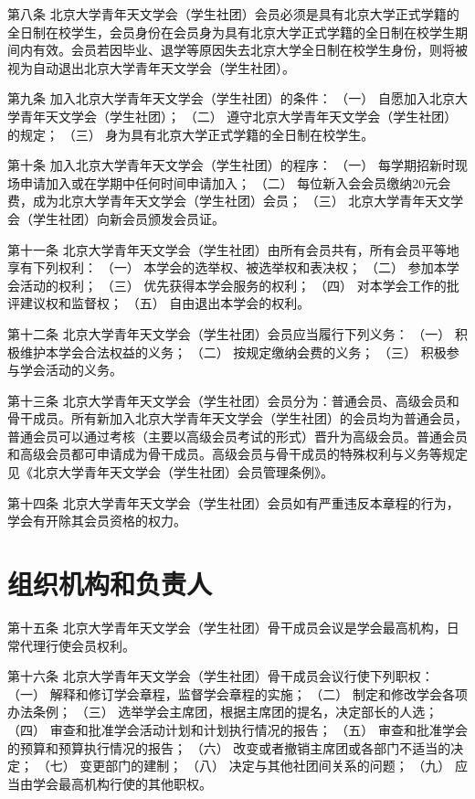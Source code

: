 第八条  北京大学青年天文学会（学生社团）会员必须是具有北京大学正式学籍的全日制在校学生，会员身份在会员身为具有北京大学正式学籍的全日制在校学生期间内有效。会员若因毕业、退学等原因失去北京大学全日制在校学生身份，则将被视为自动退出北京大学青年天文学会（学生社团）。

第九条  加入北京大学青年天文学会（学生社团）的条件：
（一）  自愿加入北京大学青年天文学会（学生社团）；
（二）  遵守北京大学青年天文学会（学生社团）的规定；
（三）  身为具有北京大学正式学籍的全日制在校学生。

第十条  加入北京大学青年天文学会（学生社团）的程序：
（一）  每学期招新时现场申请加入或在学期中任何时间申请加入；
（二）  每位新入会会员缴纳20元会费，成为北京大学青年天文学会（学生社团）会员；
（三）  北京大学青年天文学会（学生社团）向新会员颁发会员证。

第十一条  北京大学青年天文学会（学生社团）由所有会员共有，所有会员平等地享有下列权利：
（一）  本学会的选举权、被选举权和表决权；
（二）  参加本学会活动的权利；
（三）  优先获得本学会服务的权利；
（四）  对本学会工作的批评建议权和监督权；
（五）  自由退出本学会的权利。

第十二条  北京大学青年天文学会（学生社团）会员应当履行下列义务：
（一）  积极维护本学会合法权益的义务；
（二）  按规定缴纳会费的义务；
（三）  积极参与学会活动的义务。

第十三条  北京大学青年天文学会（学生社团）会员分为：普通会员、高级会员和骨干成员。所有新加入北京大学青年天文学会（学生社团）的会员均为普通会员，普通会员可以通过考核（主要以高级会员考试的形式）晋升为高级会员。普通会员和高级会员都可申请成为骨干成员。高级会员与骨干成员的特殊权利与义务等规定见《北京大学青年天文学会（学生社团）会员管理条例》。

第十四条  北京大学青年天文学会（学生社团）会员如有严重违反本章程的行为，学会有开除其会员资格的权力。 

\section{组织机构和负责人}

第十五条  北京大学青年天文学会（学生社团）骨干成员会议是学会最高机构，日常代理行使会员权利。

第十六条  北京大学青年天文学会（学生社团）骨干成员会议行使下列职权：
（一）  解释和修订学会章程，监督学会章程的实施；
（二）  制定和修改学会各项办法条例；
（三）  选举学会主席团，根据主席团的提名，决定部长的人选；
（四）  审查和批准学会活动计划和计划执行情况的报告；
（五）  审查和批准学会的预算和预算执行情况的报告；
（六）  改变或者撤销主席团或各部门不适当的决定；
（七）  变更部门的建制；
（八）  决定与其他社团间关系的问题；
（九）  应当由学会最高机构行使的其他职权。

